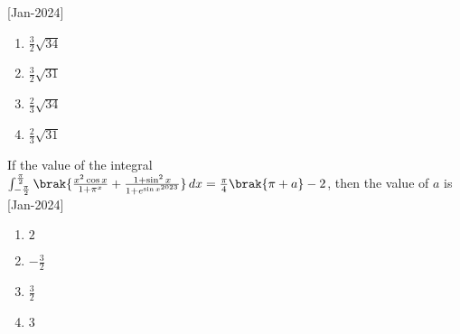    \hfill{[Jan-2024]}
        \begin{enumerate}
            \item $\frac{3}{2}\sqrt{34}$
            \item $\frac{3}{2}\sqrt{31}$
            \item $\frac{2}{3}\sqrt{34}$
            \item $\frac{2}{3}\sqrt{31}$
        \end{enumerate}
    \item If the value of the integral $\int_{-\frac{\pi}{2}}^{\frac{\pi}{2}}\brak{\frac{x^2\cos{x}}{1+\pi^x}+\frac{1+\sin^2{x}}{1+e^{\sin{x}^{2023}}}} \, dx=\frac{\pi}{4}\brak{\pi+a}-2$, then the value of $a$ is 
    \hfill{[Jan-2024]}
        \begin{enumerate}
            \item $2$
            \item $-\frac{3}{2}$
            \item $\frac{3}{2}$
            \item $3$
        \end{enumerate}
